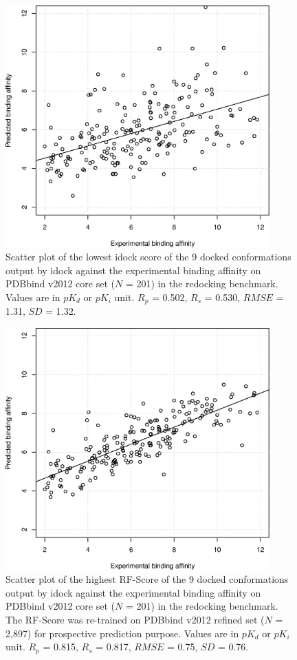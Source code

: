 \begin{figure}
\begin{center}
\includegraphics[width=4in]{../istar/pK-idockConf1idock.eps}
\end{center}
\caption{Scatter plot of the lowest idock score of the 9 docked conformations output by idock against the experimental binding affinity on PDBbind v2012 core set ($N$ = 201) in the redocking benchmark. Values are in $pK_d$ or $pK_i$ unit. $R_p$ = 0.502, $R_s$ = 0.530, $RMSE$ = 1.31, $SD$ = 1.32.}
\label{pK-idockConf1idock}
\end{figure}

\begin{figure}
\begin{center}
\includegraphics[width=4in]{../istar/pK-idockConfsRFScoreMax.eps}
\end{center}
\caption{Scatter plot of the highest RF-Score of the 9 docked conformations output by idock against the experimental binding affinity on PDBbind v2012 core set ($N$ = 201) in the redocking benchmark. The RF-Score was re-trained on PDBbind v2012 refined set ($N$ = 2,897) for prospective prediction purpose. Values are in $pK_d$ or $pK_i$ unit. $R_p$ = 0.815, $R_s$ = 0.817, $RMSE$ = 0.75, $SD$ = 0.76.}
\label{pK-idockConfsRFScoreMax}
\end{figure}


